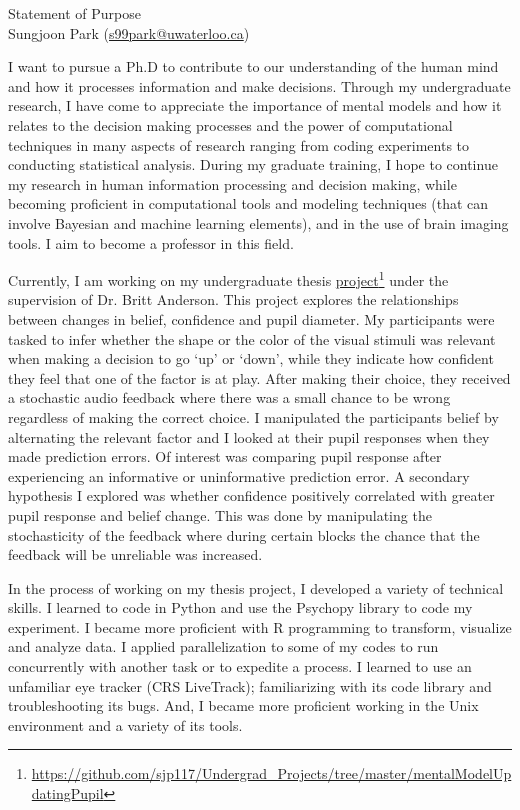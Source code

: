 \documentclass[12pt]{article}
\let\oldcenter\center
\let\oldendcenter\endcenter
\renewenvironment{center}{\setlength\topsep{-1pt}\oldcenter}{\oldendcenter}
\begin{document}
	
	\begin{center}
		\singlespacing
		{\Large Statement of Purpose} \\
		{\normalsize Sungjoon Park (\href{mailto:s99park@uwaterloo.ca}{s99park@uwaterloo.ca})}
	\end{center}
	
	I want to pursue a Ph.D to contribute to our understanding of the human mind and how it processes information and make decisions. Through my undergraduate research, I have come to appreciate the importance of mental models and how it relates to the decision making processes and the power of computational techniques in many aspects of research ranging from coding experiments to conducting statistical analysis. During my graduate training, I hope to continue my research in human information processing and decision making, while becoming proficient in computational tools and modeling techniques (that can involve Bayesian and machine learning elements), and in the use of brain imaging tools. I aim to become a professor in this field.

	Currently, I am working on my undergraduate thesis \href{https://github.com/sjp117/Undergrad_Projects/tree/master/mentalModelUpdatingPupil}{project}\footnote{\url{https://github.com/sjp117/Undergrad\_Projects/tree/master/mentalModelUpdatingPupil}} under the supervision of Dr. Britt Anderson. This project explores the relationships between changes in belief, confidence and pupil diameter. My participants were tasked to infer whether the shape or the color of the visual stimuli was relevant when making a decision to go `up' or `down', while they indicate how confident they feel that one of the factor is at play. After making their choice, they received a stochastic audio feedback where there was a small chance to be wrong regardless of making the correct choice. I manipulated the participants belief by alternating the relevant factor and I looked at their pupil responses when they made prediction errors. Of interest was comparing pupil response after experiencing an informative or uninformative prediction error. A secondary hypothesis I explored was whether confidence positively correlated with greater pupil response and belief change. This was done by manipulating the stochasticity of the feedback where during certain blocks the chance that the feedback will be unreliable was increased.

	In the process of working on my thesis project, I developed a variety of technical skills. I learned to code in Python and use the Psychopy library to code my experiment. I became more proficient with R programming to transform, visualize and analyze data. I applied parallelization to some of my codes to run concurrently with another task or to expedite a process. I learned to use an unfamiliar eye tracker (CRS LiveTrack); familiarizing with its code library and troubleshooting its bugs. And, I became more proficient working in the Unix environment and a variety of its tools. 
\end{document}
